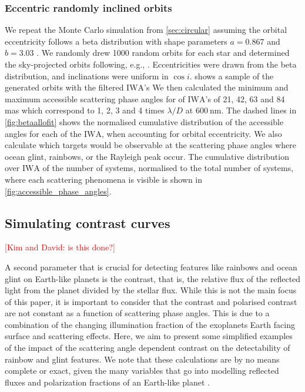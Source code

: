 \documentclass[
    usenatbib,
]{mnras}
\newcommand{\todo}[1]{\textcolor{red}{[#1]}}
\newcommand{\IWA}{\ensuremath{\mathrm{IWA}}}
\begin{document}
\subsubsection{Eccentric randomly inclined orbits}
\label{sec:eccentric}
We repeat the Monte Carlo simulation from \cref{sec:circular} assuming the orbital eccentricity follows a beta distribution with shape parameters $a=0.867$ and $b=3.03$ \citep{2013MNRAS.434L..51K}. 
%
We randomly drew 1000 random orbits for each star and determined the sky-projected orbits following, e.g., \cite{2010exop.book...15M}. Eccentricities were drawn from the beta distribution, and inclinations were uniform in $\cos i$.  shows a sample of the generated orbits with the filtered \IWA's
%
%
We then calculated the minimum and maximum accessible scattering phase angles for of \IWA's of 21, 42, 63 and 84 mas which correspond to 1, 2, 3 and 4 times $\lambda / D$ at $\SI{600}{\nano\meter}$.
%
The dashed lines in \cref{fig:betaallofit} shows the normalised cumulative distribution of the accessible angles for each of the \IWA, when accounting for orbital eccentricity.
%
We also calculate which targets would be observable at the scattering phase angles where ocean glint, rainbows, or the Rayleigh peak occur.
%
The cumulative distribution over \IWA{} of the number of systems, normalised to the total number of systems, where each scattering phenomena is visible is shown in \cref{fig:accessible_phase_angles}.
%
 
\subsection{Simulating contrast curves}
\todo{Kim and David: is this done?}

A second parameter that is crucial for detecting features like rainbows and ocean glint on Earth-like planets is the contrast, that is, the relative flux of the reflected light from the planet divided by the stellar flux. 
%
While this is not the main focus of this paper, it is important to consider that the contrast and polarised contrast are not constant as a function of scattering phase angles.
%
This is due to a combination of the changing illumination fraction of the exoplanets Earth facing surface and scattering effects.
%
Here, we aim to present some simplified examples of the impact of the scattering angle dependent contrast on the detectability of rainbow and glint features. 
%
We note that these calculations are by no means complete or exact, given the many variables that go into modelling reflected fluxes and polarization fractions of an Earth-like planet \citep{ treesandstam2019,trees2022}.
\end{document}
